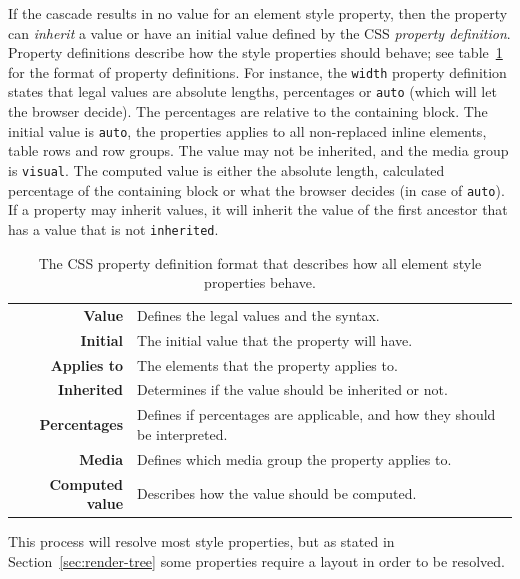 \documentclass[a4paper,11pt]{kth-mag}
\newcommand{\code}[1]{\texttt{#1}}
\begin{document}
        If the cascade results in no value for an \gls{element} style property, then the property can \emph{inherit} a value or have an initial value defined by the \gls{CSS} \emph{property definition}.
        Property definitions describe how the style properties should behave; see table~\ref{table:css_property_definition} for the format of property definitions.
        For instance, the \code{width} property definition states that legal values are absolute lengths, percentages or \code{auto} (which will let the \gls{browser} decide).
        The percentages are relative to the containing block.
        The initial value is \code{auto}, the properties applies to all non-replaced inline \glspl{element}, table rows and row groups.
        The value may not be inherited, and the media group is \code{visual}.
        The computed value is either the absolute length, calculated percentage of the containing block or what the \gls{browser} decides (in case of \code{auto}).
        If a property may inherit values, it will inherit the value of the first ancestor that has a value that is not \code{inherited}.

        \begin{table}[ht]\center
          \tiny
          \begin{tabular}[t]{ r | l }
            \textbf{Value} & Defines the legal values and the syntax. \\
            \textbf{Initial} & The initial value that the property will have. \\
            \textbf{Applies to} & The \glspl{element} that the property applies to. \\
            \textbf{Inherited} & Determines if the value should be inherited or not. \\
            \textbf{Percentages} & Defines if percentages are applicable, and how they should be interpreted. \\
            \textbf{Media} & Defines which media group the property applies to. \\
            \textbf{Computed value} & Describes how the value should be computed. \\
          \end{tabular}
          \caption{The \gls{CSS} property definition format that describes how all \gls{element} style properties behave.}
          \label{table:css_property_definition}
        \end{table}

        This process will resolve most style properties, but as stated in Section~\ref{sec:render-tree} some properties require a layout in order to be resolved.
\end{document}
